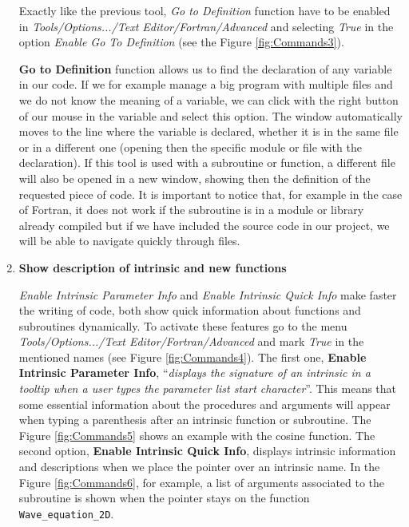 \begin{enumerate}
    Exactly like the previous tool, \textit{Go to Definition} function have to be enabled in \textit{Tools/Options.../Text Editor/Fortran/Advanced} and selecting \textit{True} in the option \textit{Enable Go To Definition} (see the Figure \ref{fig:Commands3}).
    
	\textbf{Go to Definition} function allows us to find the declaration of any variable in our code. If we for example manage a big program with multiple files and we do not know the meaning of a variable, we can click with the right button of our mouse in the variable and select this option. The window automatically moves to the line where the variable is declared, whether it is in the same file or in a different one (opening then the specific module or file with the declaration). If this tool is used with a subroutine or function, a different file will also be opened in a new window, showing then the definition of the requested piece of code. It is important to notice that, for example in the case of Fortran, it does not work if the subroutine is in a module or library already compiled but if we have included the source code in our project, we will be able to navigate quickly through files.
    
    
    \item \textbf{Show description of intrinsic and new functions}
	
	\textit{Enable Intrinsic Parameter Info} and \textit{Enable Intrinsic Quick Info} make faster the writing of code, both show quick information about functions and subroutines dynamically. To activate these features go to the menu \textit{Tools/Options.../Text Editor/Fortran/Advanced} and mark \textit{True} in the mentioned names (see Figure \ref{fig:Commands4}). The first one, \textbf{Enable Intrinsic Parameter Info}, ``\textit{displays the signature of an intrinsic in a tooltip when a user types the parameter list start character}''. This means that some essential information about the procedures and arguments will appear when typing a parenthesis after an intrinsic function or subroutine. The Figure \ref{fig:Commands5} shows an example with the cosine function. The second option, \textbf{Enable Intrinsic Quick Info}, displays intrinsic information and descriptions when we place the pointer over an intrinsic name. In the Figure \ref{fig:Commands6}, for example, a list of arguments associated to the subroutine is shown when the pointer stays on the function \texttt{Wave\_equation\_2D}.
	

\end{enumerate}
